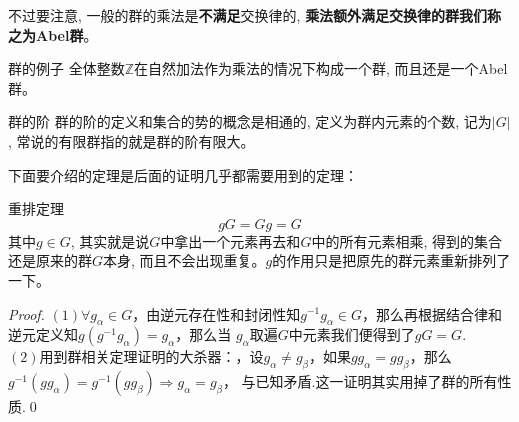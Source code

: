 不过要注意, 一般的群的乘法是\textbf{不满足}交换律的, \textbf{乘法额外满足交换律的群我们称之为Abel群}。
\begin{example}{群的例子}
    全体整数$\mathbb{Z}$在自然加法作为乘法的情况下构成一个群, 而且还是一个Abel群。
\end{example}
\begin{define}{群的阶}
    群的阶的定义和集合的势的概念是相通的, 定义为群内元素的个数, 记为$|G|$, 常说的有限群指的就是群的阶有限大。
\end{define}
下面要介绍的定理是后面的证明几乎都需要用到的定理：
\begin{theorem}{重排定理}
    \begin{equation*}
        gG=Gg=G
    \end{equation*}
    其中$g\in G$, 其实就是说$G$中拿出一个元素再去和$G$中的所有元素相乘, 得到的集合还是原来的群$G$本身, 而且不会出现重复。$g$的作用只是把原先的群元素重新排列了一下。
\end{theorem}
\begin{proof}
     $(1)\forall g_\alpha \in G$，由逆元存在性和封闭性知$g^{-1}g_\alpha \in G$，那么再根据结合律和逆元定义知$g(g^{-1}g_\alpha)=g_\alpha$，那么当
    $g_\alpha$取遍$G$中元素我们便得到了$gG=G$.\\
    $(2)$用到群相关定理证明的大杀器：{\color{red}{反证法}}，设$g_\alpha\neq g_\beta$，如果$gg_\alpha=gg_\beta$，那么$g^{-1}(gg_\alpha)=g^{-1}(gg_\beta)\Rightarrow g_\alpha= g_\beta$，
    与已知矛盾.这一证明其实用掉了群的所有性质.\qed
\end{proof}
